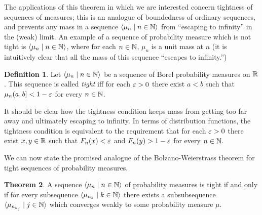 \documentclass[leqno]{article}
\theoremstyle{definition}
\newtheorem{theorem}{Theorem}[section]
\newtheorem{definition}[theorem]{Definition}
\newcommand{\bldseq}[2]{\langle{#1}\mid{#2}\rangle}
\begin{document}
The applications of this theorem in which we are interested concern tightness of sequences of measures; this is an analogue of boundedness of ordinary sequences, and prevents any mass in a sequence $\bldseq{\mu_n}{n \in \N}$ from ``escaping to infinity'' in the (weak) limit. An example of a sequence of probability measure which is not tight is $\bldseq{\mu_n}{n \in \N}$, where for each $n \in \mathbb{N}$, $\mu_n$ is a unit mass at $n$ (it is intuitively clear that all the mass of this sequence ``escapes to infinity.'')

\begin{definition}
Let $\bldseq{\mu_n}{n \in \N}$ be a sequence of Borel probability measures on $\mathbb{R}$. This sequence is called {\em tight} iff for each $\varepsilon > 0$ there exist $a < b$ such that $\mu_n (a,b] < 1 - \varepsilon$ for every $n \in \mathbb{N}$. 
\end{definition}

It should be clear how the tightness condition keeps mass from getting too far away and ultimately escaping to infinity. In terms of distribution functions, the tightness condition is equivalent to the requirement that for each $\varepsilon > 0$ there exist $x, y \in \mathbb{R}$ such that $F_n(x) < \varepsilon$ and $F_n(y) > 1 - \varepsilon$ for every $n \in \mathbb{N}$.

We can now state the promised analogue of the Bolzano-Weierstrass theorem for tight sequences of probability measures.

\begin{theorem}
A sequence $\bldseq{\mu_n}{n \in \N}$ of probability measures is tight if and only if for every subsequence $\bldseq{\mu_{n_k}}{k \in \N}$ there exists a subsubsequence $\bldseq{\mu_{n_{k_j}}}{j \in \N}$ which converges weakly to some probability measure $\mu$.
\end{theorem}
\end{document}
